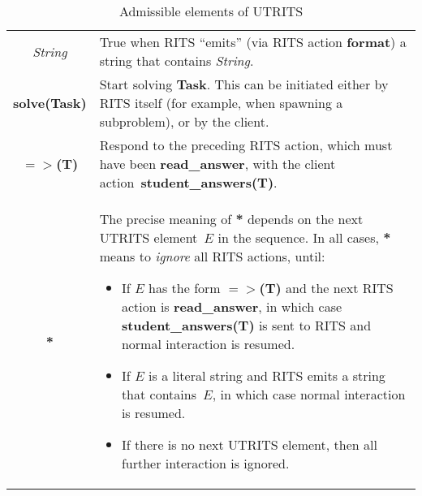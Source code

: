 \documentclass[a4paper,11pt]{article}
\begin{document}
\begin{table}[ht]
  \centering
  \begin{tabular}{cp{8.5cm}}
    \hline
    \textit{String} & True when RITS ``emits'' (via RITS action \textbf{format}) a string that contains \textit{String}. \\
    \textbf{solve(Task)} & Start solving \textbf{Task}. This can be initiated either by RITS itself (for example, when spawning a subproblem), or by the client.\\
    \textbf{$=>$(T)} & Respond to the preceding RITS action, which must have been \textbf{read\_answer}, with the client action~\textbf{student\_answers(T)}. \\
    \textbf{*} & The precise meaning of \textbf{*} depends on the next UTRITS element~$E$ in the sequence. In all cases, \textbf{*} means to \textit{ignore} all RITS actions, until:
    \begin{itemize}
    \item If $E$ has the form \textbf{$=>$(T)} and the next RITS action is \textbf{read\_answer}, in which case \textbf{student\_answers(T)} is sent to RITS and normal interaction is resumed.
    \item If $E$ is a literal string and RITS emits a string that contains~$E$, in which case normal interaction is resumed.
    \item If there is no next UTRITS element, then all further interaction is ignored.
    \end{itemize}\\
    \hline
  \end{tabular}
\caption{Admissible elements of UTRITS}
  \label{tab:utrits}
\end{table}



\vfil
\end{document}
